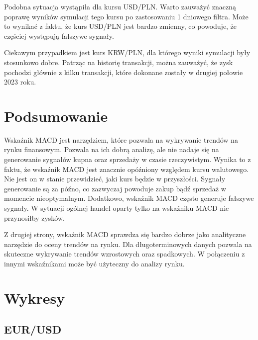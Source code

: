 \documentclass[12pt, a4paper]{article}
\begin{document}
Podobna sytuacja wystąpiła dla kursu USD/PLN. Warto zauważyć znaczną poprawę wyników symulacji
tego kursu po zastosowaniu 1 dniowego filtra. Może to wynikać z faktu, że kurs USD/PLN jest
bardzo zmienny, co powoduje, że częściej występują fałszywe sygnały.

Ciekawym przypadkiem jest kurs KRW/PLN, dla którego wyniki symulacji były stosunkowo dobre. Patrząc
na historię transakcji, można zauważyć, że zysk pochodzi głównie z kilku transakcji, które
dokonane zostały w drugiej połowie 2023 roku.

\section{Podsumowanie}
Wskaźnik MACD jest narzędziem, które pozwala na wykrywanie trendów na rynku finansowym.
Pozwala na ich dobrą analizę, ale nie nadaje się na generowanie sygnałów kupna oraz sprzedaży
w czasie rzeczywistym. Wynika to z faktu, że wskaźnik MACD jest znacznie opóźniony
względem kursu walutowego. Nie jest on w stanie przewidzieć, jaki kurs będzie
w przyszłości. Sygnały generowanie są za późno, co zazwyczaj powoduje
zakup bądź sprzedaż w momencie nieoptymalnym. Dodatkowo, wskaźnik MACD często
generuje fałszywe sygnały. W sytuacji ogólnej handel oparty tylko
na wskaźniku MACD nie przynosiłby zysków.

Z drugiej strony, wskaźnik MACD sprawdza się bardzo dobrze jako analityczne narzędzie
do oceny trendów na rynku. Dla długoterminowych danych pozwala na skuteczne
wykrywanie trendów wzrostowych oraz spadkowych. W połączeniu z innymi wskaźnikami
może być użyteczny do analizy rynku.


\pagebreak






\section{Wykresy}
\label{sec:Wykresy}

\subsection{EUR/USD}
\end{document}

